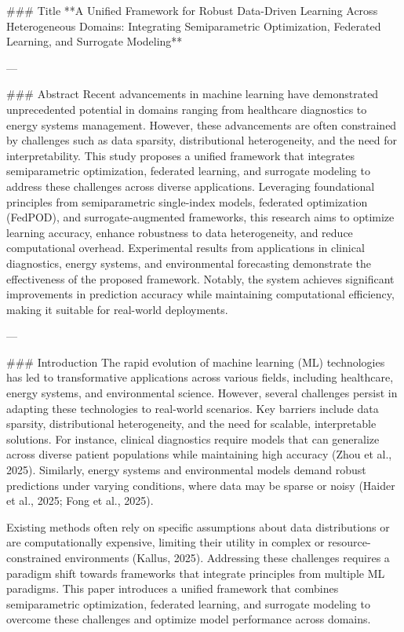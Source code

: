 ### Title
**A Unified Framework for Robust Data-Driven Learning Across Heterogeneous Domains: Integrating Semiparametric Optimization, Federated Learning, and Surrogate Modeling**

---

### Abstract
Recent advancements in machine learning have demonstrated unprecedented potential in domains ranging from healthcare diagnostics to energy systems management. However, these advancements are often constrained by challenges such as data sparsity, distributional heterogeneity, and the need for interpretability. This study proposes a unified framework that integrates semiparametric optimization, federated learning, and surrogate modeling to address these challenges across diverse applications. Leveraging foundational principles from semiparametric single-index models, federated optimization (FedPOD), and surrogate-augmented frameworks, this research aims to optimize learning accuracy, enhance robustness to data heterogeneity, and reduce computational overhead. Experimental results from applications in clinical diagnostics, energy systems, and environmental forecasting demonstrate the effectiveness of the proposed framework. Notably, the system achieves significant improvements in prediction accuracy while maintaining computational efficiency, making it suitable for real-world deployments.

---

### Introduction
The rapid evolution of machine learning (ML) technologies has led to transformative applications across various fields, including healthcare, energy systems, and environmental science. However, several challenges persist in adapting these technologies to real-world scenarios. Key barriers include data sparsity, distributional heterogeneity, and the need for scalable, interpretable solutions. For instance, clinical diagnostics require models that can generalize across diverse patient populations while maintaining high accuracy (Zhou et al., 2025). Similarly, energy systems and environmental models demand robust predictions under varying conditions, where data may be sparse or noisy (Haider et al., 2025; Fong et al., 2025).

Existing methods often rely on specific assumptions about data distributions or are computationally expensive, limiting their utility in complex or resource-constrained environments (Kallus, 2025). Addressing these challenges requires a paradigm shift towards frameworks that integrate principles from multiple ML paradigms. This paper introduces a unified framework that combines semiparametric optimization, federated learning, and surrogate modeling to overcome these challenges and optimize model performance across domains.

